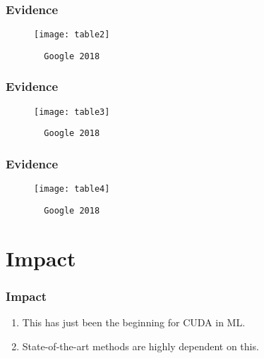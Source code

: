 \documentclass{beamer}
\begin{document}
\begin{frame} [fragile]
  \frametitle{Evidence}

  \begin{figure}[h]
  \center
  \texttt{[image: table2]}
  {\tiny
  \begin{verbatim}
  Google 2018
  \end{verbatim}
  }
  \end{figure}
\end{frame}

\begin{frame} [fragile]
  \frametitle{Evidence}

  \begin{figure}[h]
  \center
  \texttt{[image: table3]}
  {\tiny
  \begin{verbatim}
  Google 2018
  \end{verbatim}
  }
  \end{figure}
\end{frame}

\begin{frame} [fragile]
  \frametitle{Evidence}

  \begin{figure}[h]
  \center
  \texttt{[image: table4]}
  {\tiny
  \begin{verbatim}
  Google 2018
  \end{verbatim}
  }
  \end{figure}
\end{frame}


\section{Impact}

\begin{frame}
  \frametitle{Impact}

  \begin{enumerate}
    \item This has just been the beginning for CUDA in ML.
    \item State-of-the-art methods are highly dependent on this.
  \end{enumerate}
\end{frame}
\end{document}
